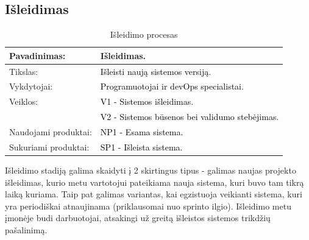 \documentclass{VUMIFPSkursinis}
\begin{document}
	\subsection{Išleidimas}
	\begin{center}
		\begin{table}[ht]
			\caption{Išleidimo procesas}
			\begin{tabular}{ | l | l | }
				\hline
				Pavadinimas:         & Išleidimas.						\\ \hline
				Tikslas:             & \textcolor{black}{Išleisti naują sistemos versiją.}			\\ \hline
				Vykdytojai:          & \textcolor{black}{Programuotojai ir devOps specialistai.}		\\ \hline
				Veiklos:             & \textcolor{black}{V1 - Sistemos išleidimas. }				\\
				                     & \textcolor{black}{V2 - Sistemos būsenos bei validumo stebėjimas.}	\\ \hline
				Naudojami produktai: & \textcolor{black}{NP1 - Esama sistema.}					\\ \hline
				Sukuriami produktai: & \textcolor{black}{SP1 - Išleista sistema. }				\\ \hline
			\end{tabular}
		\end{table}
	\end{center}
	Išleidimo stadiją galima skaidyti į 2 skirtingus tipus - galimas naujas projekto išleidimas, kurio metu vartotojui pateikiama nauja sistema, kuri buvo tam tikrą laiką kuriama.
	Taip pat galimas variantas, kai egzistuoja veikianti sistema, kuri yra periodiškai atnaujinama (priklausomai nuo sprinto ilgio).
	Išleidimo metu įmonėje budi darbuotojai, atsakingi už greitą išleistos sistemos trikdžių pašalinimą.
	\newpage
\end{document}
